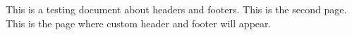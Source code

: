 \documentclass{article}
\begin{document}
This is a testing document about headers and footers.
\newpage
This is the second page.
\newpage
\thispagestyle{style2}
This is the page where custom header and footer will appear.
\end{document}
